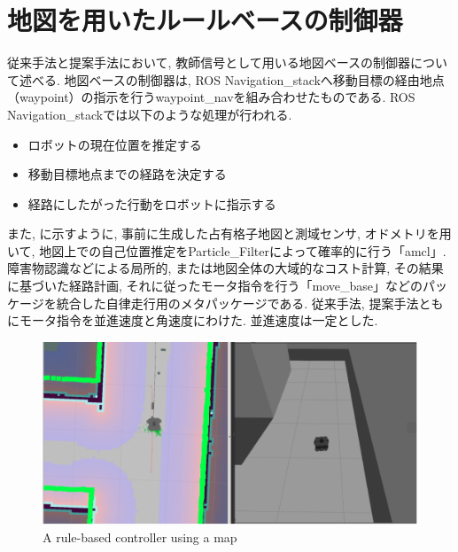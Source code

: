 
\section{地図を用いたルールベースの制御器}
従来手法と提案手法において, 教師信号として用いる地図ベースの制御器について述べる. 地図ベースの制御器は, ROS Navigation\_stack\cite{navigation:online}へ移動目標の経由地点（waypoint）の指示を行うwaypoint\_nav\cite{waypoint_nav:online}を組み合わせたものである. ROS Navigation\_stackでは以下のような処理が行われる. 

\begin{itemize}
  \item ロボットの現在位置を推定する
  \item 移動目標地点までの経路を決定する
  \item 経路にしたがった行動をロボットに指示する
\end{itemize}

また, に示すように, 事前に生成した占有格子地図と測域センサ, オドメトリを用いて, 地図上での自己位置推定をParticle\_Filterによって確率的に行う「amcl」. 障害物認識などによる局所的, または地図全体の大域的なコスト計算, その結果に基づいた経路計画, それに従ったモータ指令を行う「move\_base」などのパッケージを統合した自律走行用のメタパッケージである. 従来手法, 提案手法ともにモータ指令を並進速度と角速度にわけた. 並進速度は一定とした.


\begin{figure}[hbtp]
  \centering
 \includegraphics[keepaspectratio, scale=0.7]
      {images/navigation.png}
 \caption{A rule-based controller using a map}
 \label{Fig:navigation}
\end{figure}

\newpage